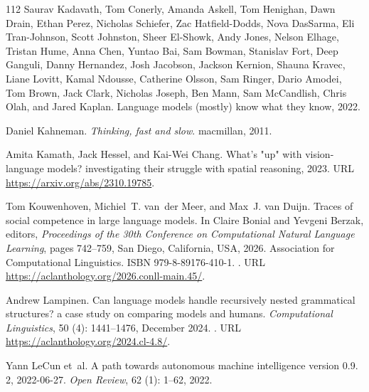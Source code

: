 \begin{thebibliography}{112}
Saurav Kadavath, Tom Conerly, Amanda Askell, Tom Henighan, Dawn Drain, Ethan Perez, Nicholas Schiefer, Zac Hatfield-Dodds, Nova DasSarma, Eli Tran-Johnson, Scott Johnston, Sheer El-Showk, Andy Jones, Nelson Elhage, Tristan Hume, Anna Chen, Yuntao Bai, Sam Bowman, Stanislav Fort, Deep Ganguli, Danny Hernandez, Josh Jacobson, Jackson Kernion, Shauna Kravec, Liane Lovitt, Kamal Ndousse, Catherine Olsson, Sam Ringer, Dario Amodei, Tom Brown, Jack Clark, Nicholas Joseph, Ben Mann, Sam McCandlish, Chris Olah, and Jared Kaplan.
\newblock Language models (mostly) know what they know, 2022.

Daniel Kahneman.
\newblock \emph{Thinking, fast and slow}.
\newblock macmillan, 2011.

Amita Kamath, Jack Hessel, and Kai-Wei Chang.
\newblock What's "up" with vision-language models? investigating their struggle with spatial reasoning, 2023.
\newblock URL \url{https://arxiv.org/abs/2310.19785}.

Tom Kouwenhoven, Michiel~T. van~der Meer, and Max~J. van Duijn.
\newblock Traces of social competence in large language models.
\newblock In Claire Bonial and Yevgeni Berzak, editors, \emph{Proceedings of the 30th Conference on Computational Natural Language Learning}, pages 742--759, San Diego, California, USA, 2026. Association for Computational Linguistics.
\newblock ISBN 979-8-89176-410-1.
\newblock {}.
\newblock URL \url{https://aclanthology.org/2026.conll-main.45/}.

Andrew Lampinen.
\newblock Can language models handle recursively nested grammatical structures? a case study on comparing models and humans.
\newblock \emph{Computational Linguistics}, 50 (4): 1441--1476, December 2024.
\newblock {}.
\newblock URL \url{https://aclanthology.org/2024.cl-4.8/}.

Yann LeCun et~al.
\newblock A path towards autonomous machine intelligence version 0.9. 2, 2022-06-27.
\newblock \emph{Open Review}, 62 (1): 1--62, 2022.


\end{thebibliography}
